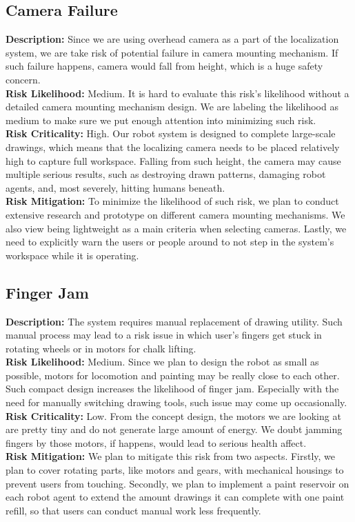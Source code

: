 \subsection{Camera Failure}
\textbf{Description:} Since we are using overhead camera as a part of the localization system, we are take risk of potential failure in camera mounting mechanism. If such failure happens, camera would fall from height, which is a huge safety concern.\\
\textbf{Risk Likelihood:} Medium. It is hard to evaluate this risk’s likelihood without a detailed camera mounting mechanism design. We are labeling the likelihood as medium to make sure we put enough attention into minimizing such risk.\\
\textbf{Risk Criticality:} High. Our robot system is designed to complete large-scale drawings, which means that the localizing camera needs to be placed relatively high to capture full workspace. Falling from such height, the camera may cause multiple serious results, such as destroying drawn patterns, damaging robot agents, and, most severely, hitting humans beneath. \\
\textbf{Risk Mitigation:} To minimize the likelihood of such risk, we plan to conduct extensive research and prototype on different camera mounting mechanisms. We also view being lightweight as a main criteria when selecting cameras. Lastly, we need to explicitly warn the users or people around to not step in the system’s workspace while it is operating.

\subsection{Finger Jam}
\textbf{Description:} The system requires manual replacement of drawing utility. Such manual process may lead to a risk issue in which user’s fingers get stuck in rotating wheels or in motors for chalk lifting. \\
\textbf{Risk Likelihood:} Medium. Since we plan to design the robot as small as possible, motors for locomotion and painting may be really close to each other. Such compact design increases the likelihood of finger jam. Especially with the need for manually switching drawing tools, such issue may come up occasionally. \\
\textbf{Risk Criticality:} Low. From the concept design, the motors we are looking at are pretty tiny and do not generate large amount of energy. We doubt jamming fingers by those motors, if happens, would lead to serious health affect.\\
\textbf{Risk Mitigation:} We plan to mitigate this risk from two aspects. Firstly, we plan to cover rotating parts, like motors and gears, with mechanical housings to prevent users from touching. Secondly, we plan to implement a paint reservoir on each robot agent to extend the amount drawings it can complete with one paint refill, so that users can conduct manual work less frequently.